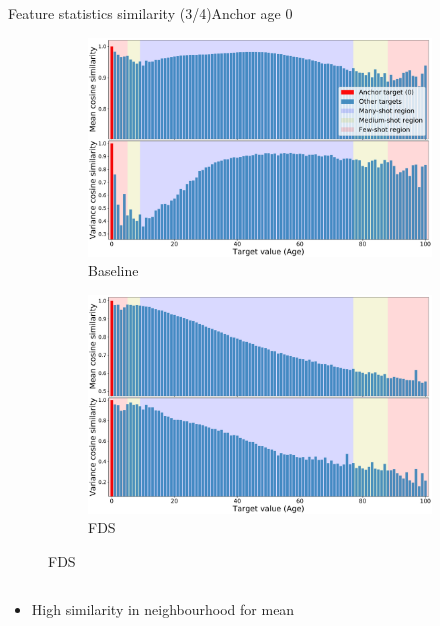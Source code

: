 \begin{frame}{Feature statistics similarity (3/4)}{Anchor age 0}
	\begin{figure}[h]
		\begin{subfigure}{0.48\textwidth}
			\includegraphics[width=\linewidth]{images/feat_sim_fds_base_0.pdf}
			\caption{Baseline}
		\end{subfigure}\hspace{1em}%
		\begin{subfigure}{0.48\textwidth}
			\includegraphics[width=\linewidth]{images/feat_sim_fds_ours_0.pdf}
			\caption{FDS}
		\end{subfigure}
	\end{figure}
	\vspace{-1em}
	\begin{columns}
		\footnotesize
		\begin{column}{0.5\textwidth}
			\begin{itemize}
				\item High similarity in neighbourhood for mean

\end{itemize}
\end{column}
\end{columns}
\end{frame}
